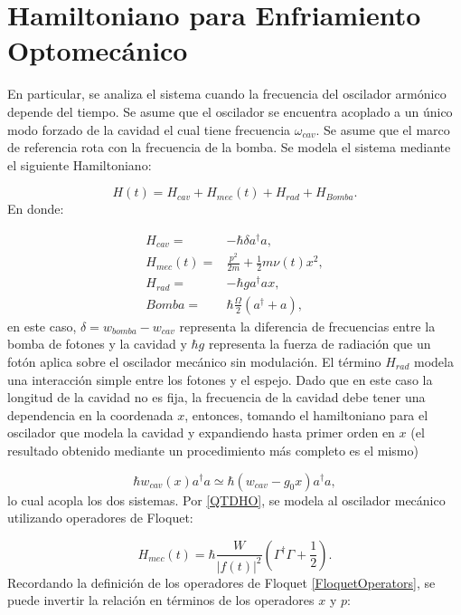 \documentclass[a4paper,10pt]{report}
\begin{document}
\section{Hamiltoniano para Enfriamiento Optomecánico}

En particular, se analiza el sistema cuando la frecuencia del oscilador armónico depende del tiempo. Se asume que el oscilador se encuentra acoplado a un único modo forzado de la cavidad el cual tiene frecuencia $\omega_{cav}$. Se asume que el marco de referencia rota con la frecuencia de la bomba. Se modela el sistema mediante el siguiente Hamiltoniano\cite{BarberisLC}:

\begin{equation}
H(t) = H_{cav} + H_{mec}(t) + H_{rad} + H_{Bomba}.
\end{equation} En donde:

\begin{align}
H_{cav} =& -\hbar \delta a^\dagger a,\\
H_{mec}(t) =& \frac{p^2}{2m} + \frac{1}{2}m \nu (t) x^2,\\
H_{rad} =& -\hbar g a^\dagger a x,\\
Bomba =& \hbar\frac{\Omega}{2}(a^\dagger + a),
\end{align} en este caso, $\delta = w_{bomba} - w_{cav}$ representa la diferencia de frecuencias entre la bomba de fotones y la cavidad y $\hbar g$ representa la fuerza de radiación que un fotón aplica sobre el oscilador mecánico sin modulación. El término $H_{rad}$ modela una interacción simple entre los fotones y el espejo. Dado que en este caso la longitud de la cavidad no es fija, la frecuencia de la cavidad debe tener una dependencia en la coordenada $x$, entonces, tomando el hamiltoniano para el oscilador que modela la cavidad y expandiendo hasta primer orden en $x$\cite{KippenberCO} (el resultado obtenido mediante un procedimiento más completo es el mismo)

\begin{equation}
\hbar w_{cav}(x) a^\dagger a \simeq \hbar(w_{cav}-g_0x)a^\dagger a,
\end{equation}lo cual acopla los dos sistemas. Por \ref{QTDHO}, se modela al oscilador mecánico utilizando operadores de Floquet:

\begin{equation}
H_{mec}(t) = \hbar\frac{W}{|f(t)|^2}(\Gamma^\dagger \Gamma + \frac{1}{2}).
\end{equation} Recordando la definición de los operadores de Floquet \eqref{FloquetOperators}, se puede invertir la relación en términos de los operadores $x$ y $p$:
\end{document}
